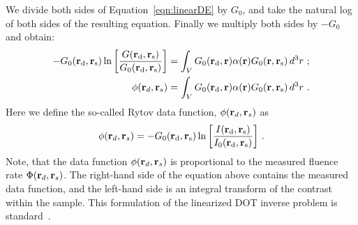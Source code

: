 We divide both sides of Equation~\ref{eqn:linearDE} by $G_0$, and take the natural log of both sides of the resulting equation. Finally we multiply both sides by $-G_0$ and obtain:
\begin{align}
-G_0(\mathbf{r}_{\rm d}, \mathbf{r}_{\rm s}) \ln\bigg[\frac{G(\mathbf{r}_{\rm d}, \mathbf{r}_{\rm s})}{G_0(\mathbf{r}_{\rm d}, \mathbf{r}_{\rm s})}\bigg] &= \int_V G_0(\mathbf{r}_{\rm d}, \mathbf{r}) \alpha(\mathbf{r}) G_0(\mathbf{r}, \mathbf{r}_{\rm s})\,d^3r \ ; \\
\phi(\mathbf{r}_d,\mathbf{r}_s) &= \int_V G_0(\mathbf{r}_{\rm d}, \mathbf{r}) \alpha(\mathbf{r}) G_0(\mathbf{r}, \mathbf{r}_{\rm s})\,d^3r \ .
\label{eqn:linearphi}
\end{align}
Here we define the so-called Rytov data function, $\phi(\mathbf{r}_d,\mathbf{r}_s)$ as
\begin{equation}
\label{eqn:datafunction}
\phi(\mathbf{r}_d,\mathbf{r}_s) =-G_0(\mathbf{r}_{\rm d}, \mathbf{r}_{\rm s}) \ln\bigg[\frac{I(\mathbf{r}_{\rm d}, \mathbf{r}_{\rm s})}{I_0(\mathbf{r}_{\rm d}, \mathbf{r}_{\rm s})}\bigg] \ .
\end{equation}
\noindent
Note, that the data function $\phi(\mathbf{r}_d,\mathbf{r}_s)$ is proportional to the measured fluence rate $\Phi(\mathbf{r}_d,\mathbf{r}_s)$. The right-hand side of the equation above contains the measured data function, and the left-hand side is an integral transform of the contrast within the sample. This formulation of the linearized DOT inverse problem is standard~\cite{Schotland1997}. 


